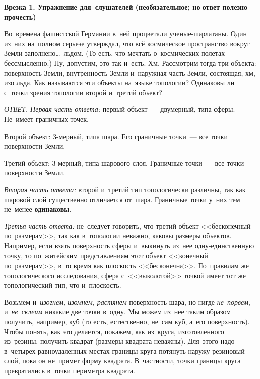 \medskip

\hrulefill

\smallskip

\textbf{Врезка 1.
Упражнение для~слушателей (необязательное; но ответ полезно прочесть)}

Во~времена фашистской Германии в~ней процветали ученые-шарлатаны. Один из~них на~полном серьезе
утверждал, что всё космическое пространство вокруг Земли заполнено\ldots\ льдом. (То есть, что мечтать
о~космических полетах бессмысленно.) Ну, допустим, это так и~есть. Хм. Рассмотрим тогда три
объекта: поверхность Земли, внутренность Земли и~наружная часть Земли, состоящая, хм, изо льда. Как
называются эти объекты на~языке топологии? Одинаковы ли с~точки зрения топологии второй и~третий
объект?

\textit{ОТВЕТ. Первая часть ответа:} первый объект~--- двумерный, типа сферы. Не~имеет граничных точек.

Второй объект: 3-мерный, типа шара. Его граничные точки~--- все точки поверхности Земли.

Третий объект: 3-мерный, типа шарового слоя. Граничные точки~--- все точки поверхности Земли.

\textit{Вторая часть ответа:} второй и~третий тип топологически различны, так как шаровой слой
существенно отличается от~шара.
 Граничные точки у~них тем не~менее \textbf{одинаковы}.

\textit{Третья часть ответа:} не~следует говорить, что третий объект <<бесконечный по~размерам>>, так как
в~топологии неважно, каковы размеры объектов. Например, если взять поверхность сферы и~выкинуть
из~нее одну-единственную точку, то по~житейским представлениям этот объект <<конечный по~размерам>>,
в~то время как плоскость <<бесконечна>>. По~правилам же топологического исследования, сфера
с~<<выколотой>> точкой имеет тот же топологический тип, что и~плоскость.

\smallskip

\hrulefill

\medskip

Возьмем и~\textit{изогнем, изомнем, растянем} поверхность шара, но нигде \textit{не~порвем}, и~\textit{не~склеим} никакие две
точки в~одну. Мы можем из~нее таким образом получить, например, куб (то есть, естественно, не~сам
куб, а~его поверхность). Чтобы понять, как это делается, покажем, как из~круга, изготовленного
из~резины, получить квадрат (размеры квадрата неважны). Для~этого надо в~четырех равноудаленных
местах границы круга потянуть наружу резиновый слой, пока он не~примет форму квадрата. В~частности,
точки границы круга превратились в~точки периметра квадрата.

